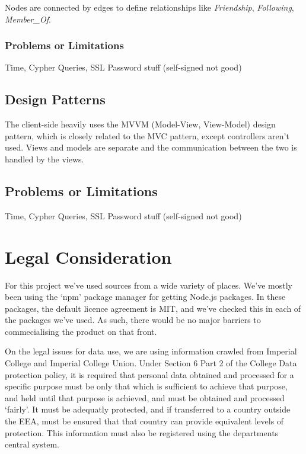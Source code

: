 \documentclass[11pt]{article}
\begin{document}
Nodes are connected by edges to define relationships like \textit{Friendship}, \textit{Following}, \textit{Member\_Of}.

\subsubsection{Problems or Limitations}
	
	Time, Cypher Queries, SSL Password stuff (self-signed not good)

\subsection{Design Patterns}

The client-side heavily uses the MVVM (Model-View, View-Model) design pattern, which is closely related to the MVC pattern, except controllers aren't used. Views and models are separate and the communication between the two is handled by the views.

\subsection {Problems or Limitations}
	Time, Cypher Queries, SSL Password stuff (self-signed not good)


\section {Legal Consideration}

For this project we've used sources from a wide variety of places. We've mostly been using the `npm' package manager for getting Node.js packages. In these packages, the default licence agreement is MIT, and we've checked this in each of the packages we've used. As such, there would be no major barriers to commecialising the product on that front.

On the legal issues for data use, we are using information crawled from  Imperial College and Imperial College Union. Under Section 6 Part 2 of the College Data protection policy, it is required that personal data obtained and processed for a specific purpose must be only that which is sufficient to achieve that purpose, and held until that purpose is achieved, and must be obtained and processed `fairly'. It must be adequatly protected, and if transferred to a country outside the EEA, must be ensured that that country can provide equivalent levels of protection. This information must also be registered using the departments central system.
\end{document}
